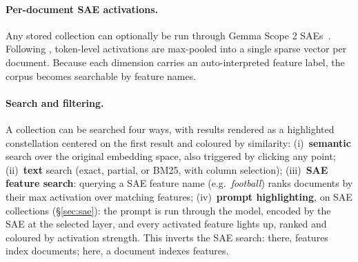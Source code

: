 \documentclass[11pt]{article}
\begin{document}









\paragraph{Per-document SAE activations.}
Any stored collection can optionally be run through Gemma Scope 2 SAEs~\cite{mcdougall2025gemmascope2}. Following \citet{jiang2025interpretableembeddingssparseautoencoders}, token-level activations are max-pooled into a single sparse vector per document. Because each dimension carries an auto-interpreted feature label, the corpus becomes searchable by feature names. 

\paragraph{Search and filtering.}
A collection can be searched four ways, with results rendered as a highlighted constellation centered on the first result and coloured by similarity: (i)~\textbf{semantic} search over the original embedding space, also triggered by clicking any point; (ii)~\textbf{text} search (exact, partial, or BM25, with column selection); (iii)~\textbf{SAE feature search}: querying a SAE feature name (e.g.\ \emph{football}) ranks documents by their max activation over matching features; (iv)~\textbf{prompt highlighting}, on SAE collections (\S\ref{sec:sae}): the prompt is run through the model, encoded by the SAE at the selected layer, and every activated feature lights up, ranked and coloured by activation strength. This inverts the SAE search: there, features index documents; here, a document indexes features.
\end{document}

